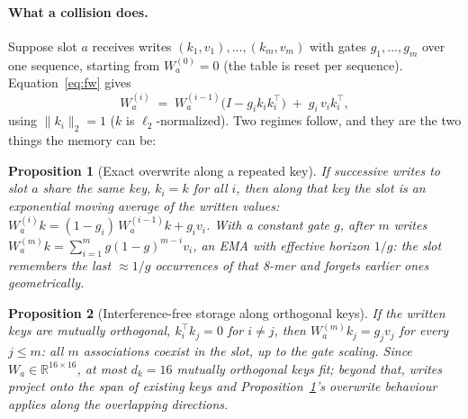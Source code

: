 \documentclass[11pt]{article}
\theoremstyle{plain}
\newtheorem{proposition}{Proposition}
\begin{document}
\paragraph{What a collision does.} Suppose slot $a$ receives writes $(k_1,v_1),\dots,(k_m,v_m)$
with gates $g_1,\dots,g_m$ over one sequence, starting from $W_a^{(0)}=0$ (the table is reset per
sequence). Equation~\ref{eq:fw} gives
\begin{equation}
W_a^{(i)} \;=\; W_a^{(i-1)}\bigl(I - g_i k_i k_i^{\top}\bigr) \;+\; g_i\,v_i k_i^{\top},
\label{eq:fw-recur}
\end{equation}
using $\|k_i\|_2 = 1$ ($k$ is $\ell_2$-normalized). Two regimes follow, and they are the two
things the memory can be:

\begin{proposition}[Exact overwrite along a repeated key]\label{prop:ema}
If successive writes to slot $a$ share the same key, $k_i = k$ for all $i$, then along that key
the slot is an exponential moving average of the written values:
$W_a^{(i)}k = (1-g_i)\,W_a^{(i-1)}k + g_i v_i$. With a constant gate $g$, after $m$ writes
$W_a^{(m)}k = \sum_{i=1}^{m}g(1-g)^{m-i}v_i$, an EMA with effective horizon $1/g$: the slot
remembers the last $\approx 1/g$ occurrences of that 8-mer and forgets earlier ones geometrically.
\end{proposition}

\begin{proposition}[Interference-free storage along orthogonal keys]\label{prop:rls}
If the written keys are mutually orthogonal, $k_i^{\top}k_j = 0$ for $i\neq j$, then
$W_a^{(m)}k_j = g_j v_j$ for every $j\le m$: all $m$ associations coexist in the slot, up to the
gate scaling. Since $W_a \in \mathbb{R}^{16\times16}$, at most $d_k = 16$ mutually orthogonal keys
fit; beyond that, writes project onto the span of existing keys and Proposition~\ref{prop:ema}'s
overwrite behaviour applies along the overlapping directions.
\end{proposition}
\end{document}
